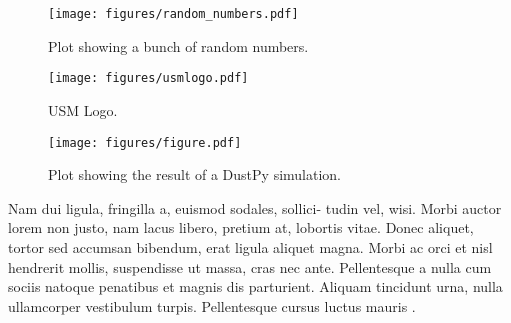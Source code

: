 \documentclass{aa}
\begin{document}
\begin{figure}
    \begin{centering}
        \texttt{[image: figures/random\_numbers.pdf]}
        \caption{
            Plot showing a bunch of random numbers.
        }
        \label{fig:random_numbers}
    \end{centering}
\end{figure}

\begin{figure}
    \begin{centering}
        \texttt{[image: figures/usmlogo.pdf]}
        \caption{
            USM Logo.
        }
        \label{fig:usm_logo}
    \end{centering}
\end{figure}

\begin{figure}
    \begin{centering}
        \texttt{[image: figures/figure.pdf]}
        \caption{
            Plot showing the result of a DustPy simulation.
        }
        \label{fig:simulation_dustpy}
    \end{centering}
\end{figure}

Nam dui ligula, fringilla a, euismod sodales, sollici- tudin vel, wisi.
Morbi auctor lorem non justo, nam lacus libero, pretium at, lobortis vitae.
Donec aliquet, tortor sed accumsan bibendum, erat ligula aliquet magna.
Morbi ac orci et nisl hendrerit mollis, suspendisse ut massa, cras nec ante.
Pellentesque a nulla cum sociis natoque penatibus et magnis dis parturient.
Aliquam tincidunt urna, nulla ullamcorper vestibulum turpis.
Pellentesque cursus luctus mauris \citep{Luger2021}.


\end{document}
